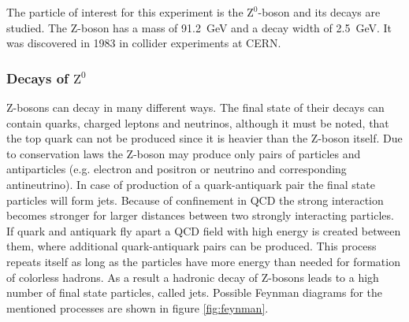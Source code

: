 \documentclass[11pt, a4paper]{article}
\numberwithin{equation}{section}
\begin{document}
The particle of interest for this experiment is the $\mathrm{Z}^0$-boson and its decays are studied.
The Z-boson has a mass of \SI{91.2}{GeV} and a decay width of \SI{2.5}{GeV}.
It was discovered in 1983 in collider experiments at CERN.

\subsubsection{Decays of $\mathrm{Z}^0$}

Z-bosons can decay in many different ways.
The final state of their decays can contain quarks, charged leptons and neutrinos, although it must be noted, that the top quark can not be produced since it is heavier than the Z-boson itself.
Due to conservation laws the Z-boson may produce only pairs of particles and antiparticles (e.g. electron and positron or neutrino and corresponding antineutrino).
In case of production of a quark-antiquark pair the final state particles will form jets.
Because of confinement in QCD the strong interaction becomes stronger for larger distances between two strongly interacting particles.
If quark and antiquark fly apart a QCD field with high energy is created between them, where additional quark-antiquark pairs can be produced.
This process repeats itself as long as the particles have more energy than needed for formation of colorless hadrons.
As a result a hadronic decay of Z-bosons leads to a high number of final state particles, called jets.
Possible Feynman diagrams for the mentioned processes are shown in figure \ref{fig:feynman}.
\end{document}
